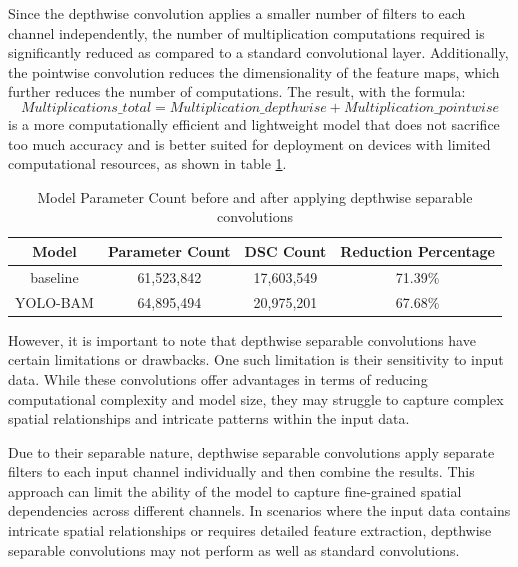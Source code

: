 Since the depthwise convolution applies a smaller number of filters to each channel independently, the number of multiplication computations required is significantly reduced as compared to a standard convolutional layer. Additionally, the pointwise convolution reduces the dimensionality of the feature maps, which further reduces the number of computations. The result, with the formula:
\[ Multiplications\_total = Multiplication\_depthwise + Multiplication\_pointwise\]
is a more computationally efficient and lightweight model that does not sacrifice too much accuracy and is better suited for deployment on devices with limited computational resources, as shown in table \ref{tab:dsccomparisons}.

\begin{table}[!htbp]
    \centering
    \caption{Model Parameter Count before and after applying depthwise separable convolutions}
    \resizebox{0.95\linewidth}{!}
    {
    \begin{tabular}{cccc}
          Model & Parameter Count & DSC Count & Reduction Percentage\\
          \hline
          baseline & 61,523,842 & 17,603,549 & 71.39\% \\
          \hline
          YOLO-BAM & 64,895,494 & 20,975,201 & 67.68\% \\
          \hline
    \end{tabular}
    }
    \label{tab:dsccomparisons}
\end{table}

However, it is important to note that depthwise separable convolutions have certain limitations or drawbacks. One such limitation is their sensitivity to input data. While these convolutions offer advantages in terms of reducing computational complexity and model size, they may struggle to capture complex spatial relationships and intricate patterns within the input data.

Due to their separable nature, depthwise separable convolutions apply separate filters to each input channel individually and then combine the results. This approach can limit the ability of the model to capture fine-grained spatial dependencies across different channels. In scenarios where the input data contains intricate spatial relationships or requires detailed feature extraction, depthwise separable convolutions may not perform as well as standard convolutions.